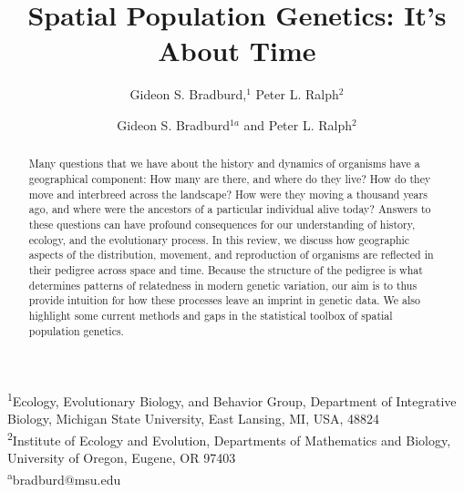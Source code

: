 \documentclass{ar-1col}
\begin{document}
\ifsubmissionversion
{}
\fi

\title{Spatial Population Genetics: It's About Time}

\ifsubmissionversion
\author{Gideon S. Bradburd,$^1$ Peter L. Ralph$^2$
}
\else

\author{Gideon S. Bradburd$^{1a}$ and Peter L. Ralph$^2$}
\maketitle

\noindent\textsuperscript{1}Ecology, Evolutionary Biology, and Behavior Group, Department of Integrative Biology, Michigan State University, East Lansing, MI, USA, 48824\\

\noindent\textsuperscript{2}Institute of Ecology and Evolution, Departments of Mathematics and Biology, University of Oregon, Eugene, OR 97403\\

\noindent\textsuperscript{a}bradburd@msu.edu\\
\fi

\begin{abstract}
    Many questions that we have about the history and dynamics of organisms
    have a geographical component:
    How many are there, and where do they live?
    How do they move and interbreed across the landscape?
    How were they moving a thousand years ago,
    and where were the ancestors of a particular individual alive today?
    Answers to these questions can have profound consequences
    for our understanding of history, ecology, and the evolutionary process.
    In this review, we discuss how geographic aspects of the 
    distribution, movement, and reproduction of organisms
    are reflected in their pedigree across space and time.
    Because the structure of the pedigree is what determines 
    patterns of relatedness in modern genetic variation,
    our aim is to thus provide intuition for how these processes
    leave an imprint in genetic data.
    We also highlight some current methods and gaps 
    in the statistical toolbox of spatial population genetics.
\end{abstract}
\end{document}
